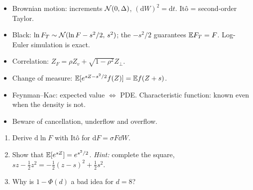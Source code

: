 \begin{riassunto}
\begin{itemize}
\item Brownian motion: increments $\mathcal{N}(0,\Delta)$, $(\mathrm{d}W)^2=\mathrm{d}t$. Itô = second-order Taylor.
\item Black: $\ln F_T\sim\mathcal{N}(\ln F-s^2/2,\,s^2)$; the $-s^2/2$ guarantees $\mathbb{E} F_T=F$. Log-Euler simulation is exact.
\item Correlation: $Z_F=\rho Z_v+\sqrt{1-\rho^2}Z_\perp$.
\item Change of measure: $\mathbb{E}[e^{sZ-s^2/2}f(Z)]=\mathbb{E} f(Z+s)$.
\item Feynman--Kac: expected value $\Leftrightarrow$ PDE. Characteristic function: known even when the density is
not.
\item Beware of cancellation, underflow and overflow.
\end{itemize}
\end{riassunto}

\begin{domande}[unbreakable]
\begin{enumerate}
\item Derive $\mathrm{d}\ln F$ with Itô for $\mathrm{d}F=\sigma F\dd W$.
\item Show that $\mathbb{E}[e^{sZ}]=e^{s^2/2}$. \emph{Hint:} complete the square,
$sz-\tfrac12z^2=-\tfrac12(z-s)^2+\tfrac12s^2$.
\item Why is $1-\Phi(d)$ a bad idea for $d=8$?
\end{enumerate}
\end{domande}
